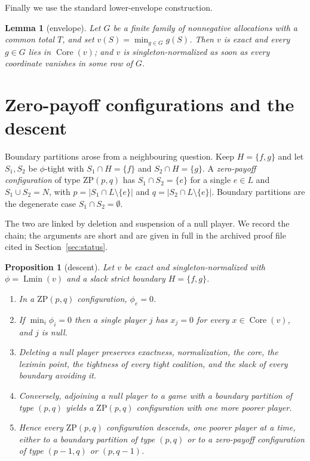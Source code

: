 \documentclass[11pt]{article}
\newtheorem{lemma}[theorem]{Lemma}
\newtheorem{proposition}[theorem]{Proposition}
\newcommand{\core}{\operatorname{Core}}
\newcommand{\Lmin}{\operatorname{Lmin}}
\begin{document}
Finally we use the standard lower-envelope construction.

\begin{lemma}[envelope]\label{lem:env}
Let $G$ be a finite family of nonnegative allocations with a common total $T$,
and set $v(S)=\min_{g\in G}g(S)$.  Then $v$ is exact and every $g\in G$ lies in
$\core(v)$; and $v$ is singleton-normalized as soon as every coordinate
vanishes in some row of $G$.
\end{lemma}

\section{Zero-payoff configurations and the descent}\label{sec:descent}

Boundary partitions arose from a neighbouring question.  Keep $H=\{f,g\}$ and
let $S_1,S_2$ be $\phi$-tight with $S_1\cap H=\{f\}$ and $S_2\cap H=\{g\}$.  A
\emph{zero-payoff configuration} of type $\mathrm{ZP}(p,q)$ has
$S_1\cap S_2=\{e\}$ for a single $e\in L$ and $S_1\cup S_2=N$, with
$p=|S_1\cap L\setminus\{e\}|$ and $q=|S_2\cap L\setminus\{e\}|$.  Boundary
partitions are the degenerate case $S_1\cap S_2=\emptyset$.

The two are linked by deletion and suspension of a null player.  We record the
chain; the arguments are short and are given in full in the archived proof file
cited in Section~\ref{sec:status}.

\begin{proposition}[descent]\label{prop:descent}
Let $v$ be exact and singleton-normalized with $\phi=\Lmin(v)$ and a slack
strict boundary $H=\{f,g\}$.
\begin{enumerate}[nosep,label=(\roman*)]
\item In a $\mathrm{ZP}(p,q)$ configuration, $\phi_e=0$.
\item If $\min_i\phi_i=0$ then a single player $j$ has $x_j=0$ for every
      $x\in\core(v)$, and $j$ is null.
\item Deleting a null player preserves exactness, normalization, the core, the
      leximin point, the tightness of every tight coalition, and the slack of
      every boundary avoiding it.
\item Conversely, adjoining a null player to a game with a boundary partition
      of type $(p,q)$ yields a $\mathrm{ZP}(p,q)$ configuration with one more
      poorer player.
\item Hence every $\mathrm{ZP}(p,q)$ configuration descends, one poorer player
      at a time, either to a boundary partition of type $(p,q)$ or to a
      zero-payoff configuration of type $(p-1,q)$ or $(p,q-1)$.
\end{enumerate}
\end{proposition}
\end{document}
